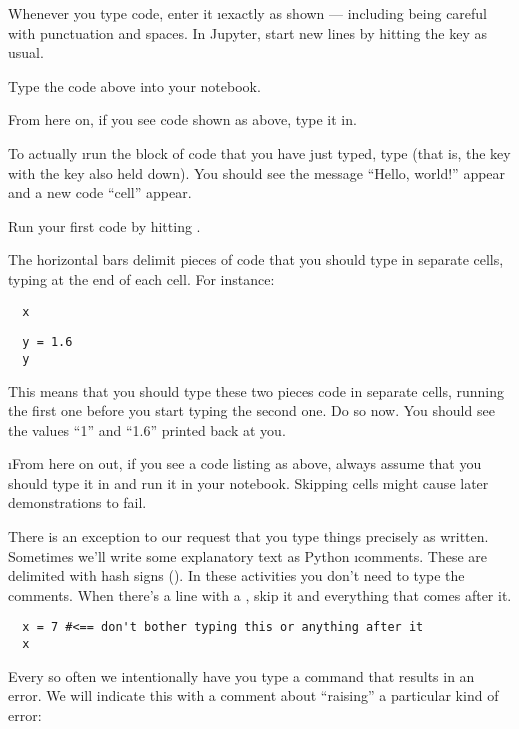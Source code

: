 \documentclass[letterpaper, 12pt, titlepage, twoside]{article}
\begin{document}
Whenever you type code, enter it \i{exactly} as shown --- including being
careful with punctuation and spaces. In Jupyter, start new lines by hitting
the  key as usual.

\begin{action}
  Type the code above into your notebook.

  From here on, if you see code shown as above, type it in.
\end{action}

To actually \i{run} the block of code that you have just typed, type
 (that is, the  key with the  key also held
down). You should see the message ``Hello, world!'' appear and a new code
“cell” appear.

\begin{action}
  Run your first code by hitting .
\end{action}

The horizontal bars delimit pieces of code that you should type in separate
cells, typing  at the end of each cell. For instance:

\begin{lstlisting}
  x
\end{lstlisting}
\begin{lstlisting}
  y = 1.6
  y
\end{lstlisting}

This means that you should type these two pieces code in separate cells,
running the first one before you start typing the second one. Do so now. You
should see the values ``1'' and ``1.6'' printed back at you.

\i{From here on out, if you see a code listing as above, always assume that
  you should type it in and run it in your notebook. Skipping cells might
  cause later demonstrations to fail.}

There is an exception to our request that you type things precisely as
written. Sometimes we'll write some explanatory text as Python \i{comments}.
These are delimited with hash signs (\s{\#}). In these activities you don't
need to type the comments. When there's a line with a \s{\#}, skip it and
everything that comes after it.

\begin{lstlisting}
  x = 7 #<== don't bother typing this or anything after it
  x
\end{lstlisting}

Every so often we intentionally have you type a command that results in an
error. We will indicate this with a comment about ``raising'' a particular
kind of error:
\end{document}
